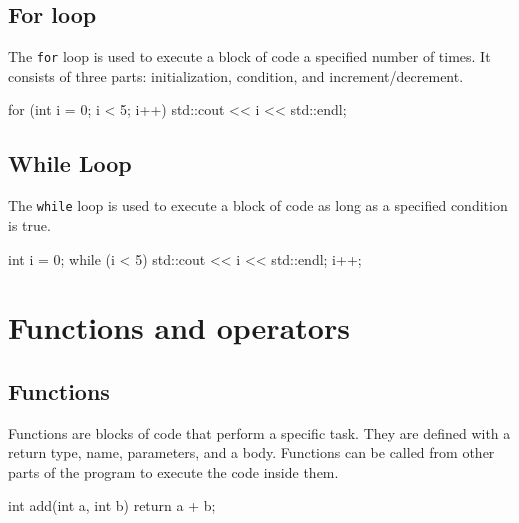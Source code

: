 \subsection{For loop}

The \texttt{for} loop is used to execute a block of code a specified number of times. It consists of three parts: initialization, condition, and increment/decrement.

\begin{exampleblock}
    \begin{codeblock}[language=C++]
for (int i = 0; i < 5; i++) {
    std::cout << i << std::endl;
}
    \end{codeblock}
\end{exampleblock}

\subsection{While Loop}

The \texttt{while} loop is used to execute a block of code as long as a specified condition is true.

\begin{exampleblock}
    \begin{codeblock}[language=C++]
int i = 0;
while (i < 5) {
    std::cout << i << std::endl;
    i++;
}
    \end{codeblock}
\end{exampleblock}

\section{Functions and operators}

\subsection{Functions}

Functions are blocks of code that perform a specific task. They are defined with a return type, name, parameters, and a body. Functions can be called from other parts of the program to execute the code inside them.

\begin{exampleblock}
    \begin{codeblock}[language=C++]
int add(int a, int b) {
    return a + b;
}
    \end{codeblock}
\end{exampleblock}

